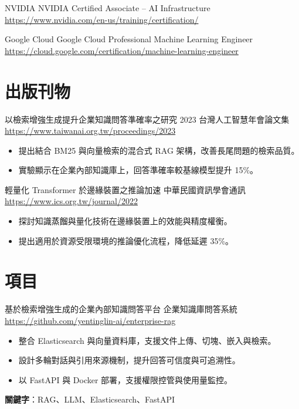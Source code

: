 \documentclass[a4paper, serif, 10pt]{moderncv}
\begin{document}
        {NVIDIA}
        {NVIDIA Certified Associate – AI Infrastructure}
        {\url{https://www.nvidia.com/en-us/training/certification/}}
        {}
        {}

        {Google Cloud}
        {Google Cloud Professional Machine Learning Engineer}
        {\url{https://cloud.google.com/certification/machine-learning-engineer}}
        {}
        {}
\section{出版刊物}

        {以檢索增強生成提升企業知識問答準確率之研究}
        {2023 台灣人工智慧年會論文集}
        {\url{https://www.taiwanai.org.tw/proceedings/2023}}
        {}
        {\begin{itemize}
\item 提出結合 BM25 與向量檢索的混合式 RAG 架構，改善長尾問題的檢索品質。
\item 實驗顯示在企業內部知識庫上，回答準確率較基線模型提升 15\%。
\end{itemize}}

        {輕量化 Transformer 於邊緣裝置之推論加速}
        {中華民國資訊學會通訊}
        {\url{https://www.ics.org.tw/journal/2022}}
        {}
        {\begin{itemize}
\item 探討知識蒸餾與量化技術在邊緣裝置上的效能與精度權衡。
\item 提出適用於資源受限環境的推論優化流程，降低延遲 35\%。
\end{itemize}}
\section{項目}

        {基於檢索增強生成的企業內部知識問答平台}
        {企業知識庫問答系統}
        {\url{https://github.com/yentinglin-ai/enterprise-rag}}
        {}
        {\begin{itemize}
\item 整合 Elasticsearch 與向量資料庫，支援文件上傳、切塊、嵌入與檢索。
\item 設計多輪對話與引用來源機制，提升回答可信度與可追溯性。
\item 以 FastAPI 與 Docker 部署，支援權限控管與使用量監控。
\end{itemize}
\textbf{關鍵字}：RAG、LLM、Elasticsearch、FastAPI}
\end{document}
